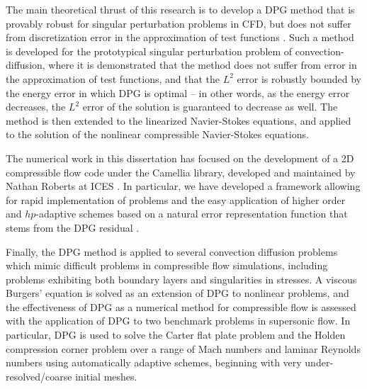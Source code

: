The main theoretical thrust of this research is to develop a DPG method that is provably robust for singular perturbation problems in CFD, but does not suffer from discretization error in the approximation of test functions \cite{DPGrobustness, DPGrobustness2}.  Such a method is developed for the prototypical singular perturbation problem of convection-diffusion, where it is demonstrated that the method does not suffer from error in the approximation of test functions, and that the $L^2$ error is robustly bounded by the energy error in which DPG is optimal -- in other words, as the energy error decreases, the $L^2$ error of the solution is guaranteed to decrease as well.  The method is then extended to the linearized Navier-Stokes equations, and applied to the solution of the nonlinear compressible Navier-Stokes equations.  

The numerical work in this dissertation has focused on the development of a 2D compressible flow code under the Camellia library, developed and maintained by Nathan Roberts at ICES \cite{Camellia}.  In particular, we have developed a framework allowing for rapid implementation of problems and the easy application of higher order and $hp$-adaptive schemes based on a natural error representation function that stems from the DPG residual \cite{DPG2, DPG3}. 

Finally, the DPG method is applied to several convection diffusion problems which mimic difficult problems in compressible flow simulations, including problems exhibiting both boundary layers and singularities in stresses.  A viscous Burgers' equation is solved as an extension of DPG to nonlinear problems, and the effectiveness of DPG as a numerical method for compressible flow is assessed with the application of DPG to two benchmark problems in supersonic flow.  In particular, DPG is used to solve the Carter flat plate problem and the Holden compression corner problem over a range of Mach numbers and laminar Reynolds numbers using automatically adaptive schemes, beginning with very under-resolved/coarse initial meshes.  
